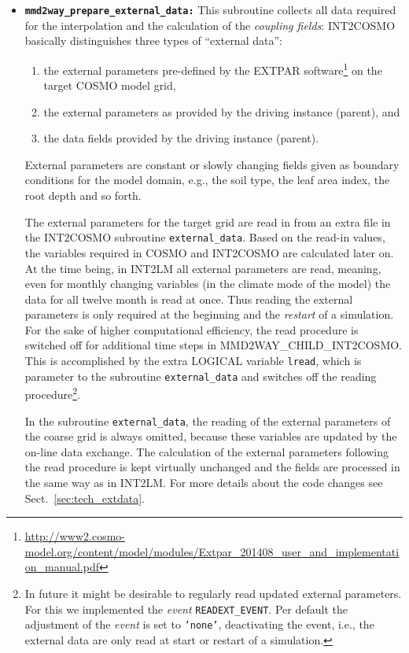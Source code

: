 \documentclass[11pt,twoside]{article}
\begin{document}
\begin{enumerate}
\begin{itemize}
\item {\tt \bf mmd2way\_prepare\_external\_data:}
This subroutine collects all data required for the interpolation and the 
calculation of the {\it coupling fields}: INT2COSMO basically distinguishes
three types of ``external data'':
\begin{enumerate} %
\item the external parameters pre-defined by the EXTPAR software\footnote{\url{http://www2.cosmo-model.org/content/model/modules/Extpar_201408_user_and_implementation_manual.pdf}} on the target COSMO model grid,
\item the external parameters as provided by the driving instance (parent), and
\item the data fields provided by the driving instance (parent).
\end{enumerate}  %

External parameters are constant or slowly changing fields given as boundary 
conditions for the model domain, e.g., the soil type, the leaf area index,
the root depth and so forth. 

The external parameters for the target grid are read in from an extra file
in the INT2COSMO subroutine \verb|external_data|.
Based on the read-in values, the variables required in COSMO and INT2COSMO are 
calculated later on.
At the time being, in INT2LM all external parameters are read, meaning, 
even for monthly changing variables (in the climate mode of the model)  
the data for all twelve month is read at once. Thus reading the external 
parameters is only required at the beginning and the {\it restart} of a 
simulation.
For the sake of higher computational efficiency, the read procedure is switched
off for additional time steps in MMD2WAY\_CHILD\_INT2COSMO. This is accomplished
by the extra {\footnotesize LOGICAL} variable \verb|lread|, which is parameter
to the subroutine \verb|external_data| and switches off the reading 
procedure\footnote{In future it might be desirable to regularly read updated 
external parameters. For this we implemented the {\it event} 
{\tt READEXT\_EVENT}.
Per default the adjustment of the {\it event} is set to {\tt 'none'},
deactivating the event, i.e., the external data are only read at start or restart
of a simulation.}.


In the subroutine \verb|external_data|,
 the reading of the external parameters of the coarse grid is always omitted, 
because these variables are updated by the on-line data exchange.
The calculation of the external parameters following the read procedure
is kept virtually unchanged and the fields are processed in the same way as in
INT2LM.
For more details about the code changes see Sect.\ \ref{sec:tech_extdata}.


\end{itemize}
\end{enumerate}
\end{document}
